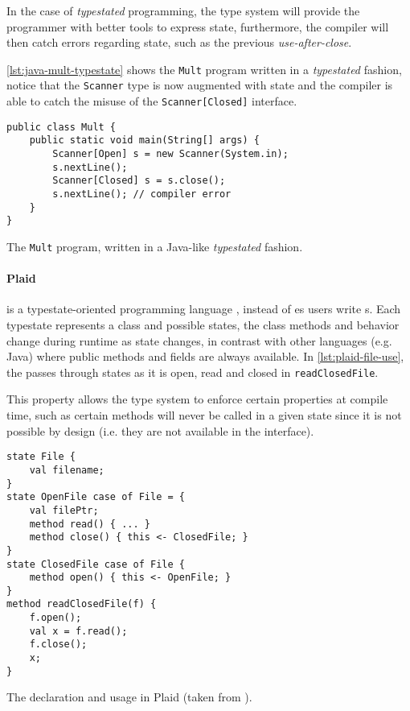 In the case of \emph{typestated} programming,
the type system will provide the programmer with better tools to express state,
furthermore, the compiler will then catch errors regarding state,
such as the previous \emph{use-after-close}.

\autoref{lst:java-mult-typestate} shows the \texttt{Mult} program written in a \emph{typestated} fashion,
notice that the \texttt{Scanner} type is now augmented with state and
the compiler is able to catch the misuse of the \texttt{Scanner[Closed]} interface.


\begin{listing}
    \centering
    \begin{verbatim}
public class Mult {
    public static void main(String[] args) {
        Scanner[Open] s = new Scanner(System.in);
        s.nextLine();
        Scanner[Closed] s = s.close();
        s.nextLine(); // compiler error
    }
}
    \end{verbatim}
    \caption{The \texttt{Mult} program, written in a Java-like \emph{typestated} fashion.}
    \label{lst:java-mult-typestate}
\end{listing}

\paragraph{Plaid} is a typestate-oriented programming language \autocite{Aldrich2009},
instead of es users write s.
Each typestate represents a class and possible states,
the class methods and behavior change during runtime as state changes,
in contrast with other languages (e.g. Java) where public methods and fields are always available.
In \autoref{lst:plaid-file-use}, the  passes through states as it is open, read and closed in \texttt{readClosedFile}.

This property allows the type system to enforce certain properties at compile time,
such as certain methods will never be called in a given state since it is not possible by design
(i.e. they are not available in the interface).


\begin{listing}
    \centering
    \begin{verbatim}
state File {
    val filename;
}
state OpenFile case of File = {
    val filePtr;
    method read() { ... }
    method close() { this <- ClosedFile; }
}
state ClosedFile case of File {
    method open() { this <- OpenFile; }
}
method readClosedFile(f) {
    f.open();
    val x = f.read();
    f.close();
    x;
}
    \end{verbatim}
    \caption{The  declaration and usage in Plaid (taken from \autocite{Mota2020}).}
    \label{lst:plaid-file-use}
\end{listing}

